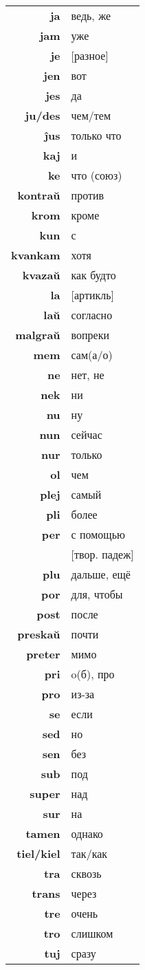 \documentclass{article}
\begin{document}
\begin{tabular}{>{\bfseries}rl}
ja & ведь, же \\
jam & уже \\
je & {}[разное] \\
jen & вот \\
jes & да \\
ju/des & чем/тем \\
ĵus & только что \\
kaj & и \\
ke & что (союз) \\
kontraŭ & против \\
krom & кроме \\
kun & с \\
kvankam & хотя \\
kvazaŭ & как будто \\
la & {}[артикль] \\
laŭ & согласно \\
malgraŭ & вопреки \\
mem & сам(а/о) \\
ne & нет, не \\
nek & ни \\
nu & ну \\
nun & сейчас \\
nur & только \\
ol & чем \\
plej & самый \\
pli & более \\
per & с помощью \\
~ & {}[твор. падеж] \\
plu & дальше, ещё \\
por & для, чтобы \\
post & после \\
preskaŭ & почти \\
preter & мимо \\
pri & o(б), про \\
pro & из-за \\
se & если \\
sed & но \\
sen & без \\
sub & под \\
super & над \\
sur & на \\
tamen & однако \\
tiel/kiel & так/как \\
tra & сквозь \\
trans & через \\
tre & очень \\
tro & слишком \\
tuj & сразу \\
\end{tabular}
\end{document}
